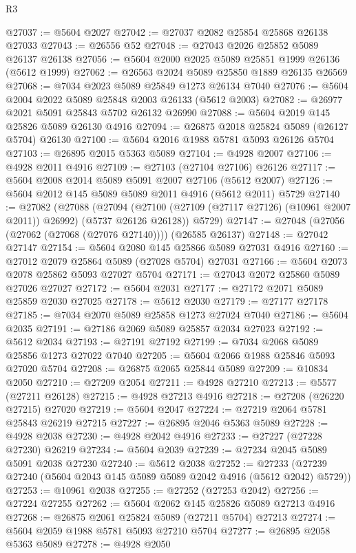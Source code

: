 \begin{lexlean}{R3}
\begin{coremodule}
@27037 := @5604 @2027
@27042 := @27037 @2082 @25854 @25868 @26138 @27033
@27043 := @26556 @52
@27048 := @27043 @2026 @25852 @5089 @26137 @26138
@27056 := @5604 @2000 @2025 @5089 @25851 @1999 @26136 (@5612 @1999)
@27062 := @26563 @2024 @5089 @25850 @1889 @26135 @26569
@27068 := @7034 @2023 @5089 @25849 @1273 @26134 @7040
@27076 := @5604 @2004 @2022 @5089 @25848 @2003 @26133 (@5612 @2003)
@27082 := @26977 @2021 @5091 @25843 @5702 @26132 @26990
@27088 := @5604 @2019 @145 @25826 @5089 @26130 @4916
@27094 := @26875 @2018 @25824 @5089 (@26127 @5704) @26130
@27100 := @5604 @2016 @1988 @5781 @5093 @26126 @5704
@27103 := @26895 @2015 @5363 @5089
@27104 := @4928 @2007
@27106 := @4928 @2011 @4916
@27109 := @27103 (@27104 @27106) @26126
@27117 := @5604 @2008 @2014 @5089 @5091 @2007 @27106 (@5612 @2007)
@27126 := @5604 @2012 @145 @5089 @5089 @2011 @4916 (@5612 @2011) @5729
@27140 := @27082
    (@27088
      (@27094 (@27100 (@27109 (@27117 @27126) (@10961 @2007 @2011)) @26992) (@5737 @26126 @26128))
      @5729)
@27147 := @27048 (@27056 (@27062 (@27068 (@27076 @27140)))) (@26585 @26137)
@27148 := @27042 @27147
@27154 := @5604 @2080 @145 @25866 @5089 @27031 @4916
@27160 := @27012 @2079 @25864 @5089 (@27028 @5704) @27031
@27166 := @5604 @2073 @2078 @25862 @5093 @27027 @5704
@27171 := @27043 @2072 @25860 @5089 @27026 @27027
@27172 := @5604 @2031
@27177 := @27172 @2071 @5089 @25859 @2030 @27025
@27178 := @5612 @2030
@27179 := @27177 @27178
@27185 := @7034 @2070 @5089 @25858 @1273 @27024 @7040
@27186 := @5604 @2035
@27191 := @27186 @2069 @5089 @25857 @2034 @27023
@27192 := @5612 @2034
@27193 := @27191 @27192
@27199 := @7034 @2068 @5089 @25856 @1273 @27022 @7040
@27205 := @5604 @2066 @1988 @25846 @5093 @27020 @5704
@27208 := @26875 @2065 @25844 @5089
@27209 := @10834 @2050
@27210 := @27209 @2054
@27211 := @4928 @27210
@27213 := @5577 (@27211 @26128)
@27215 := @4928 @27213 @4916
@27218 := @27208 (@26220 @27215) @27020
@27219 := @5604 @2047
@27224 := @27219 @2064 @5781 @25843 @26219 @27215
@27227 := @26895 @2046 @5363 @5089
@27228 := @4928 @2038
@27230 := @4928 @2042 @4916
@27233 := @27227 (@27228 @27230) @26219
@27234 := @5604 @2039
@27239 := @27234 @2045 @5089 @5091 @2038 @27230
@27240 := @5612 @2038
@27252 := @27233 (@27239 @27240 (@5604 @2043 @145 @5089 @5089 @2042 @4916 (@5612 @2042) @5729))
@27253 := @10961 @2038
@27255 := @27252 (@27253 @2042)
@27256 := @27224 @27255
@27262 := @5604 @2062 @145 @25826 @5089 @27213 @4916
@27268 := @26875 @2061 @25824 @5089 (@27211 @5704) @27213
@27274 := @5604 @2059 @1988 @5781 @5093 @27210 @5704
@27277 := @26895 @2058 @5363 @5089
@27278 := @4928 @2050

\end{coremodule}
\end{lexlean}
